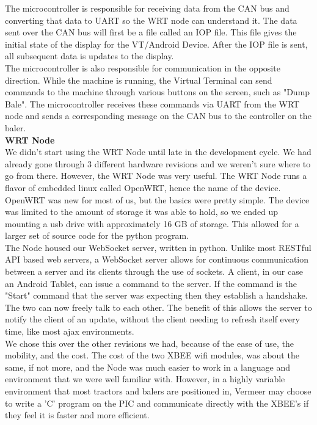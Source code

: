 \documentclass[paper=a4, fontsize=11pt]{scrartcl}
\numberwithin{equation}{section}		%
\numberwithin{figure}{section}			%
\numberwithin{table}{section}				%
\begin{document}
The microcontroller is responsible for receiving data from the CAN bus and converting that data to UART so the WRT node can understand it. The data sent over the CAN bus will first be a file called an IOP file. This file gives the initial state of the display for the VT/Android Device. After the IOP file is sent, all subsequent data is updates to the display.  \\

The microcontroller is also responsible for communication in the opposite direction. While the machine is running, the Virtual Terminal can send commands to the machine through various buttons on the screen, such as "Dump Bale". The microcontroller receives these commands via UART from the WRT node and sends a corresponding message on the CAN bus to the controller on the baler. \\

\textbf{WRT Node} \\
We didn't start using the WRT Node until late in the development cycle. We had already gone through 3 different hardware revisions and we weren't sure where to go from there. However, the WRT Node was very useful. The WRT Node runs a flavor of embedded linux called OpenWRT, hence the name of the device. OpenWRT was new for most of us, but the basics were pretty simple. The device was limited to the amount of storage it was able to hold, so we ended up mounting a usb drive with approximately 16 GB of storage. This allowed for a larger set of source code for the python program. \\

The Node housed our WebSocket server, written in python. Unlike most RESTful API based web servers, a WebSocket server allows for continuous communication between a server and its clients through the use of sockets. A client, in our case an Android Tablet, can issue a command to the server. If the command is the "Start" command that the server was expecting then they establish a handshake. The two can now freely talk to each other. The benefit of this allows the server to notify the client of an update, without the client needing to refresh itself every time, like most ajax environments. \\

We chose this over the other revisions we had, because of the ease of use, the mobility, and the cost. The cost of the two XBEE wifi modules, was about the same, if not more, and the Node was much easier to work in a language and environment that we were well familiar with. However, in a highly variable environment that most tractors and balers are positioned in, Vermeer may choose to write a 'C' program on the PIC and communicate directly with the XBEE's if they feel it is faster and more efficient. \\
\end{document}
